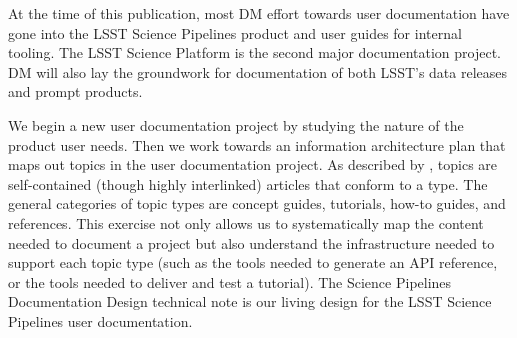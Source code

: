 At the time of this publication, most DM effort towards user documentation have gone into the LSST Science Pipelines product\cite{pipelines-guide} and user guides for internal tooling.
The LSST Science Platform is the second major documentation project.
DM will also lay the groundwork for documentation of both LSST's data releases and prompt products.

We begin a new user documentation project by studying the nature of the product user needs.
Then we work towards an information architecture plan that maps out topics in the user documentation project.
As described by , topics are self-contained (though highly interlinked) articles that conform to a type.
The general categories of topic types are concept guides, tutorials, how-to guides, and references.\cite{Procida:2017}
This exercise not only allows us to systematically map the content needed to document a project but also understand the infrastructure needed to support each topic type (such as the tools needed to generate an API reference, or the tools needed to deliver and test a tutorial).
The Science Pipelines Documentation Design\cite{DMTN-030} technical note is our living design for the LSST Science Pipelines user documentation.
